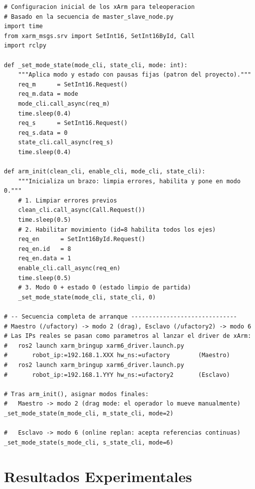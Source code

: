 \documentclass[journal,10pt,twoside]{IEEEtran}
\begin{document}
\begin{lstlisting}[caption={Configuracion inicial de los xArm -- secuencia real de arranque},
                   label={lst:setup}]
# Configuracion inicial de los xArm para teleoperacion
# Basado en la secuencia de master_slave_node.py
import time
from xarm_msgs.srv import SetInt16, SetInt16ById, Call
import rclpy

def _set_mode_state(mode_cli, state_cli, mode: int):
    """Aplica modo y estado con pausas fijas (patron del proyecto)."""
    req_m      = SetInt16.Request()
    req_m.data = mode
    mode_cli.call_async(req_m)
    time.sleep(0.4)
    req_s      = SetInt16.Request()
    req_s.data = 0
    state_cli.call_async(req_s)
    time.sleep(0.4)

def arm_init(clean_cli, enable_cli, mode_cli, state_cli):
    """Inicializa un brazo: limpia errores, habilita y pone en modo 0."""
    # 1. Limpiar errores previos
    clean_cli.call_async(Call.Request())
    time.sleep(0.5)
    # 2. Habilitar movimiento (id=8 habilita todos los ejes)
    req_en      = SetInt16ById.Request()
    req_en.id   = 8
    req_en.data = 1
    enable_cli.call_async(req_en)
    time.sleep(0.5)
    # 3. Modo 0 + estado 0 (estado limpio de partida)
    _set_mode_state(mode_cli, state_cli, 0)

# -- Secuencia completa de arranque ------------------------------
# Maestro (/ufactory) -> modo 2 (drag), Esclavo (/ufactory2) -> modo 6
# Las IPs reales se pasan como parametros al lanzar el driver de xArm:
#   ros2 launch xarm_bringup xarm6_driver.launch.py
#       robot_ip:=192.168.1.XXX hw_ns:=ufactory        (Maestro)
#   ros2 launch xarm_bringup xarm6_driver.launch.py
#       robot_ip:=192.168.1.YYY hw_ns:=ufactory2       (Esclavo)

# Tras arm_init(), asignar modos finales:
#   Maestro -> modo 2 (drag mode: el operador lo mueve manualmente)
_set_mode_state(m_mode_cli, m_state_cli, mode=2)

#   Esclavo -> modo 6 (online replan: acepta referencias continuas)
_set_mode_state(s_mode_cli, s_state_cli, mode=6)
\end{lstlisting}

\section{Resultados Experimentales}
\label{sec:experiments}
\end{document}
